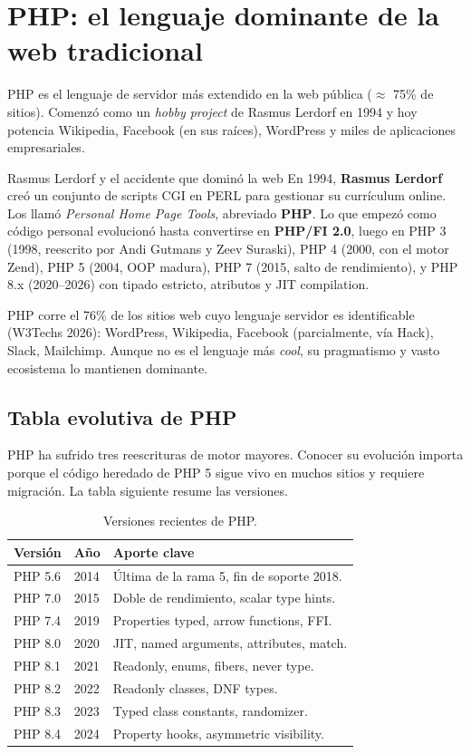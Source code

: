 \documentclass[11pt,a4paper,openany]{book}
\begin{document}
\section{PHP: el lenguaje dominante de la web tradicional}

PHP es el lenguaje de servidor más extendido en la web
pública (\(\approx\) 75\% de sitios). Comenzó como un \emph{hobby
project} de Rasmus Lerdorf en 1994 y hoy potencia Wikipedia,
Facebook (en sus raíces), WordPress y miles de aplicaciones
empresariales.


\begin{cajahistoria}{Rasmus Lerdorf y el accidente que dominó la web}
En 1994, \textbf{Rasmus Lerdorf} creó un conjunto de scripts CGI en
PERL para gestionar su currículum online. Los llamó
\emph{Personal Home Page Tools}, abreviado \textbf{PHP}. Lo que
empezó como código personal evolucionó hasta convertirse en
\textbf{PHP/FI 2.0}, luego en PHP 3 (1998, reescrito por Andi
Gutmans y Zeev Suraski), PHP 4 (2000, con el motor Zend), PHP 5
(2004, OOP madura), PHP 7 (2015, salto de rendimiento), y PHP 8.x
(2020--2026) con tipado estricto, atributos y JIT compilation.

PHP corre el 76\% de los sitios web cuyo lenguaje servidor es
identificable (W3Techs 2026): WordPress, Wikipedia, Facebook
(parcialmente, vía Hack), Slack, Mailchimp. Aunque no es el lenguaje
más \emph{cool}, su pragmatismo y vasto ecosistema lo mantienen
dominante.
\end{cajahistoria}

\subsection{Tabla evolutiva de PHP}

PHP ha sufrido tres reescrituras de motor mayores. Conocer
su evolución importa porque el código heredado de PHP 5 sigue vivo
en muchos sitios y requiere migración. La tabla siguiente resume
las versiones.


\begin{table}[htbp]
\centering
\caption{Versiones recientes de PHP.}
\footnotesize
\begin{tabularx}{\textwidth}{lll}
\toprule
\textbf{Versión} & \textbf{Año} & \textbf{Aporte clave}\\
\midrule
PHP 5.6  & 2014 & Última de la rama 5, fin de soporte 2018.\\
PHP 7.0  & 2015 & Doble de rendimiento, scalar type hints.\\
PHP 7.4  & 2019 & Properties typed, arrow functions, FFI.\\
PHP 8.0  & 2020 & JIT, named arguments, attributes, match.\\
PHP 8.1  & 2021 & Readonly, enums, fibers, never type.\\
PHP 8.2  & 2022 & Readonly classes, DNF types.\\
PHP 8.3  & 2023 & Typed class constants, randomizer.\\
PHP 8.4  & 2024 & Property hooks, asymmetric visibility.\\
\bottomrule
\end{tabularx}
\end{table}
\end{document}
